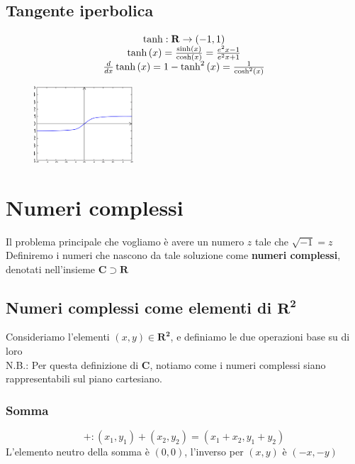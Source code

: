 \documentclass{report}
\begin{document}
    \subsection{Tangente iperbolica}
        $$\begin{array}{c}
            \tanh: \mathbf{R} \rightarrow \left(-1, 1\right) \\
            \tanh\left(x\right) = \frac{\sinh\left(x\right)}{\cosh\left(x\right)} = \frac{e^2x - 1}{e^2x + 1} \\
            \D{x}\tanh\left(x\right) = 1 - \tanh^2\left(x\right) = \frac{1}{\cosh^2\left(x\right)}
        \end{array}$$
        \begin{center}
            \begin{figure}[H]
                \includegraphics[width = 0.33\textwidth]{tanh.png}
            \end{figure}
        \end{center}
\newpage
\section{Numeri complessi}
    Il problema principale che vogliamo è avere un numero $z$ tale che $\sqrt{-1} = z$
    Definiremo i numeri che nascono da tale soluzione come \textbf{numeri complessi}, denotati nell'insieme $\mathbf{C} \supset \mathbf{R}$ \\
    \subsection{Numeri complessi come elementi di $\mathbf{R^2}$}
        Consideriamo l'elementi $\left(x, y\right) \in \mathbf{R^2}$, e definiamo le due operazioni base su di loro \\
        N.B.: Per questa definizione di $\mathbf{C}$, notiamo come i numeri complessi siano rappresentabili sul piano cartesiano.
        \subsubsection{Somma}
            $$+: \left(x_1, y_1\right) + \left(x_2, y_2\right) = \left(x_1 + x_2, y_1 + y_2\right)$$
            L'elemento neutro della somma è $\left(0, 0\right)$, l'inverso per $\left(x, y\right)$ è $\left(-x, -y\right)$
\end{document}
